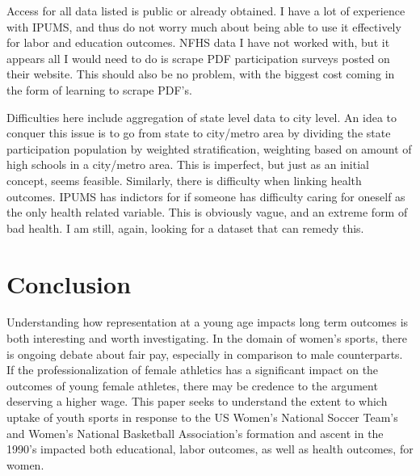 \documentclass[11pt]{article}
\newcommand{\Section}[1]{\section{#1}}
\newcommand{\1}[1]{\mathbb{I}\{#1\}}
\theoremstyle{plain}
\begin{document}
  Access for all data listed is public or already obtained. I have a lot of experience with IPUMS, and thus do not worry much about being able to use it effectively for labor and education
  outcomes. NFHS data I have not worked with, but it appears all I would need to do is scrape PDF participation surveys posted on their website. This should also be no problem, with the 
  biggest cost coming in the form of learning to scrape PDF's. 

  Difficulties here include aggregation of state level data to city level. An idea to conquer this issue is to go from state to city/metro area by dividing the state participation population
  by weighted stratification, weighting based on amount of high schools in a city/metro area. This is imperfect, but just as an initial concept, seems feasible. Similarly, there is difficulty
  when linking health outcomes. IPUMS has indictors for if someone has difficulty caring for oneself as the only health related variable. This is obviously vague, and an extreme form of bad
  health. I am still, again, looking for a dataset that can remedy this.

\Section{Conclusion}
  Understanding how representation at a young age impacts long term outcomes is both interesting and worth investigating. In the domain of women's sports, there is ongoing debate about fair pay,
  especially in comparison to male counterparts. If the professionalization of female athletics has a significant impact on the outcomes of young female athletes, there may be credence to the 
  argument deserving a higher wage. This paper seeks to understand the extent to which uptake of youth sports in response to the US Women's National Soccer Team's and Women's National Basketball 
  Association's formation and ascent in the 1990's impacted both educational, labor outcomes, as well as health outcomes, for women. 

\printbibliography
  
\end{document}
